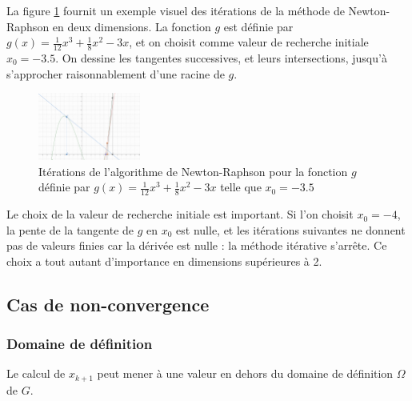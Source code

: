 \documentclass[3p, twocolumn]{elsarticle}
\begin{document}
La figure \ref{fig:nr-iterations-1} fournit un exemple visuel des itérations de la méthode de Newton-Raphson en deux dimensions. La fonction $g$ est définie par $g(x)=\frac{1}{12}x^3+\frac18x^2-3x$, et on choisit comme valeur de recherche initiale $x_0=-3.5$. On dessine les tangentes successives, et leurs intersections, jusqu'à s'approcher raisonnablement d'une racine de $g$.

\begin{figure}[htbp]
    \centering
    \includegraphics[width = 0.3\textwidth]{iteration-newton-1.png}
    \caption{Itérations de l'algorithme de Newton-Raphson pour la fonction $g$ définie par $g(x)=\frac{1}{12}x^3+\frac18x^2-3x$ telle que $x_0=-3.5$}
    \label{fig:nr-iterations-1}
\end{figure}

\begin{rmk}
    Le choix de la valeur de recherche initiale est important. Si l'on choisit $x_0=-4$, la pente de la tangente de $g$ en $x_0$ est nulle, et les itérations suivantes ne donnent pas de valeurs finies car la dérivée est nulle : la méthode itérative s'arrête. Ce choix a tout autant d'importance en dimensions supérieures à 2.
\end{rmk}

\subsection{Cas de non-convergence}
\subsubsection{Domaine de définition}
Le calcul de $x_{k+1}$ peut mener à une valeur en dehors du domaine de définition $\Omega$ de $G$.
\end{document}
